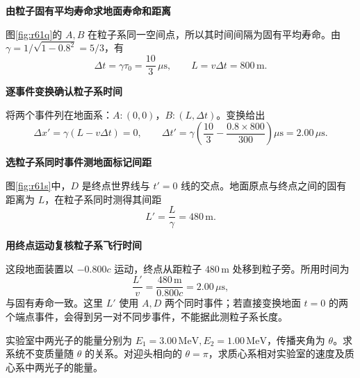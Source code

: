 \begin{solution}\textbf{由粒子固有平均寿命求地面寿命和距离}\par\nobreak
图\ref{fig:r61q}的 \(A,B\) 在粒子系同一空间点，所以其时间间隔为固有平均寿命。由 \(\gamma=1/\sqrt{1-0.8^2}=5/3\)，有
\[
 \boxed{\Delta t=\gamma\tau_0=\frac{10}{3}\,\mu\mathrm s},
 \qquad\boxed{L=v\Delta t=800\,\mathrm m}.
\]


\par\medskip{}\noindent\textbf{逐事件变换确认粒子系时间}\par\nobreak
将两个事件列在地面系：\(A:(0,0)\)，\(B:(L,\Delta t)\)。变换给出
\[
 \Delta x'=\gamma(L-v\Delta t)=0,\qquad
 \Delta t'=\gamma\left(\frac{10}{3}-\frac{0.8\times800}{300}\right)
 \mu\mathrm s=2.00\,\mu\mathrm s.
\]



\par\medskip{}\noindent\textbf{选粒子系同时事件测地面标记间距}\par\nobreak
图\ref{fig:r61s}中，\(D\) 是终点世界线与 \(t'=0\) 线的交点。地面原点与终点之间的固有距离为 \(L\)，在粒子系同时测得其间距
\[
 L'=\frac L\gamma=480\,\mathrm m.
\]


\par\medskip{}\noindent\textbf{用终点运动复核粒子系飞行时间}\par\nobreak
这段地面装置以 \(-0.800c\) 运动，终点从距粒子 \(480\,\mathrm m\) 处移到粒子旁。所用时间为
\[
 \frac{L'}{v}=\frac{480\,\mathrm m}{0.800c}=2.00\,\mu\mathrm s,
\]
与固有寿命一致。这里 \(L'\) 使用 \(A,D\) 两个同时事件；若直接变换地面 \(t=0\) 的两个端点事件，会得到另一对不同步事件，不能据此测粒子系长度。
\end{solution}

\begin{question}
\begin{example}[两个光子的系统质量]\label{ex:r62}
实验室中两光子的能量分别为 \(E_1=3.00\,\mathrm{MeV},E_2=1.00\,\mathrm{MeV}\)，传播夹角为 \(\theta\)。求系统不变质量随 \(\theta\) 的关系。对迎头相向的 \(\theta=\pi\)，求质心系相对实验室的速度及质心系中两光子的能量。
\end{example}
\end{question}

